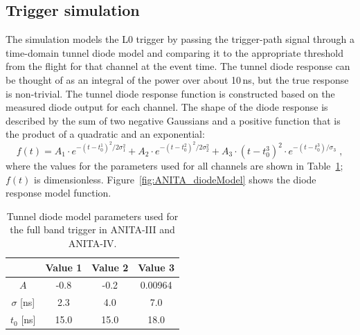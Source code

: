 


\subsection{Trigger simulation}
\label{subsec:ANITA_trigger}
The simulation models the L0 trigger by passing the
trigger-path signal through a time-domain tunnel diode model and comparing it to the
appropriate threshold from the flight for that channel at the event
time.
The tunnel diode response can be thought of as an integral of the power over about 10\,ns, but the true response is non-trivial.
The tunnel diode response function is constructed based on the
measured diode output for each channel.
The shape of the diode response is described by the sum of two negative Gaussians and a positive function that is the product of a quadratic and an exponential:
\begin{equation}
      f(t) = A_1 \cdot e^{-(t-t_0^1)^2/2\sigma_1^2} + 
      A_2 \cdot e^{-(t-t_0^2)^2/2\sigma_2^2} +
      A_3 \cdot \left( t-t_0^3 \right)^2 \cdot
      e^{-(t-t_0^3)/\sigma_3} \;,
    \end{equation}
\noindent where the values for the parameters used for all channels are shown in
Table~\ref{tab:diodeModelParameters};
$f(t)$ is dimensionless.
Figure~\ref{fig:ANITA_diodeModel} shows the diode response model function.

\begin{table}[h!]
\caption{Tunnel diode model parameters used for the full band trigger in ANITA-III and ANITA-IV.}
  \begin{center}
    \begin{tabular}{c|c|c|c} 
      & Value 1 & Value 2 & Value 3 \\
     \hline
      $A$           & -0.8  & -0.2   &  0.00964   \\
      $\sigma$ [ns] &  2.3  &  4.0   &  7.0       \\ 
      $t_0$  [ns]   & 15.0  & 15.0   & 18.0       \\
    \end{tabular}
  \end{center}
  \label{tab:diodeModelParameters}
\end{table}


